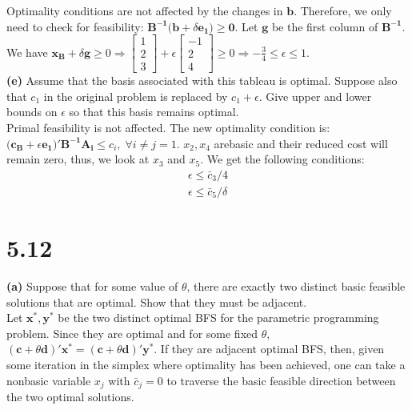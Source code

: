 \documentclass{article}
\begin{document}
\noindent 
Optimality conditions are not affected by the changes in $\mathbf{b}$.  Therefore, we only need to check for feasibility:  $\mathbf{B^{-1}(b } + \delta \mathbf{e_1) \geq 0}$.  Let $\mathbf{g}$ be the first column of $\mathbf{B^{-1}}$.  \\
We have $\mathbf{x_B} + \delta \mathbf{g} \geq 0 \Rightarrow 
\begin{bmatrix}
1 \\
2 \\
3
\end{bmatrix}
+ \epsilon
\begin{bmatrix}
-1 \\
2 \\
4
\end{bmatrix}
\geq 0
\Rightarrow - \frac{3}{4} \leq \epsilon \leq 1 $. \\

\noindent
\textbf{(e)}  Assume that the basis associated with this tableau is optimal.  Suppose also that $c_1$ in the original problem is replaced by $c_1 + \epsilon$.  Give upper and lower bounds on $\epsilon$ so that this basis remains optimal. \\

\noindent
Primal feasibility is not affected.  The new optimality condition is:  $(\mathbf{c_B} + \epsilon \mathbf{e_1)' B^{-1} A_i \leq } c_i, \; \forall i \neq j = 1$. $x_2, x_4$ arebasic and their reduced cost will remain zero, thus, we look at $x_3$ and $x_5.$ We get the following conditions: \\
\begin{equation*}
\begin{aligned}
\epsilon \leq \bar{c}_3 / {4} \\
\epsilon \leq \bar{c}_5 / \delta
\end{aligned}
\end{equation*}


\section*{5.12}
\textbf{(a)}  Suppose that for some value of $\theta$, there are exactly two distinct basic feasible solutions that are optimal.  Show that they must be adjacent.  \\

\noindent
Let $ \mathbf{x^*, y^*}$ be the two distinct optimal BFS for the parametric programming problem.  Since they are optimal and for some fixed $\theta$, $(\mathbf{c} + \theta \mathbf{d})\mathbf{' x^*} = (\mathbf{c} + \theta \mathbf{d})\mathbf{' y^*}$.  If they are adjacent optimal BFS, then, given some iteration in the simplex where optimality has been achieved, one can take a nonbasic variable $x_j$ with $\bar{c}_j = 0$ to traverse the basic feasible direction between the two optimal solutions.  \\
\end{document}
